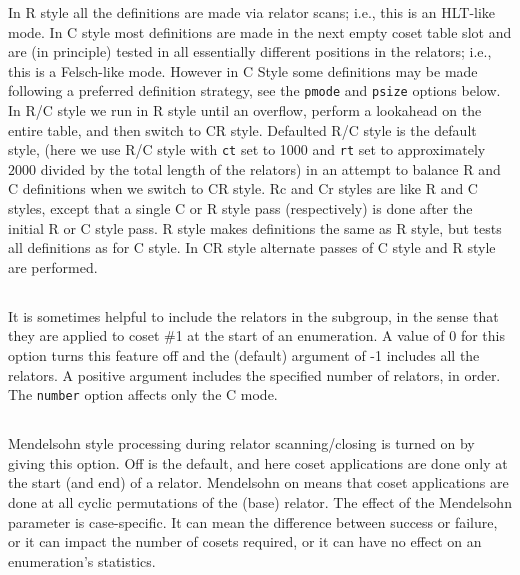 In R style all the definitions are made via relator scans; i.e., this is 
an HLT-like
mode.  In C style most definitions are made in the next empty coset table
slot and are (in principle) tested in all essentially different positions in
the relators; i.e., this is a Felsch-like mode.
However in C Style some definitions may be made following a preferred
definition strategy, see the {\tt pmode} and {\tt psize} options below.
In R/C style we run in R style until an overflow,
perform a lookahead on the entire table, and then switch to CR style.
Defaulted R/C style is the default style, (here we use R/C style with
{\tt ct} set to 1000 and {\tt rt} set to approximately $2000$ divided by the total
length of the relators) in an attempt to balance R and C definitions when
we switch to CR style.  Rc and Cr styles are like R and C styles, except
that a single C or R style pass (respectively) is done after the initial R
or C style pass.  R\* style makes definitions the same as R style, but tests
all definitions as for C style.  In CR style alternate passes of C style and
R style are performed.

\subsection{}
\label{cmd:no relators}
It is sometimes helpful to include the relators in the subgroup, in the
sense that they are applied to coset \#1 at the start of an enumeration.  A
value of 0 for this option  turns this feature off and the (default) 
argument of -1
includes all the relators.  A positive argument includes the specified
number of relators, in order.
The {\tt number} option affects only the C mode.

\subsection{}
\label{cmd:mendelsohn}
Mendelsohn style processing during relator scanning/closing is turned on by
giving this option.  Off is the default, and here coset applications are
done only at the start (and end) of a relator.  Mendelsohn on means that
coset applications are done at all cyclic permutations of the (base)
relator.  The effect of the Mendelsohn parameter is case-specific.  It can
mean the difference between success or failure, or it can impact the number
of cosets required, or it can have no effect on an enumeration's statistics.

